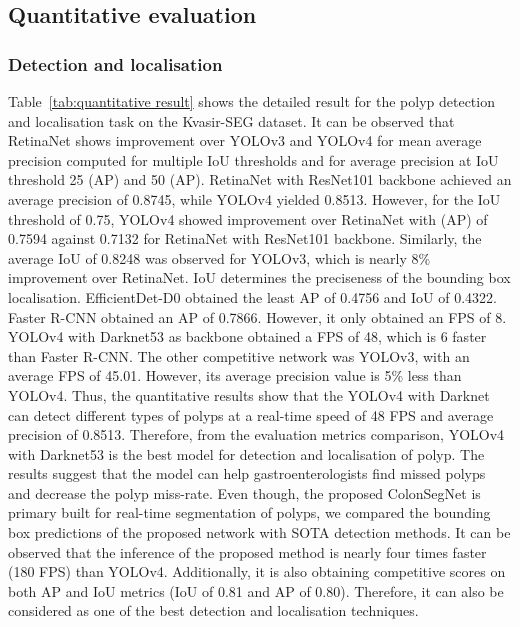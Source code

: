 \documentclass[journal]{IEEEtran}
\begin{document}
\subsection{Quantitative evaluation} 
\subsubsection{Detection and localisation} 
Table~\ref{tab:quantitative result} shows the detailed result for the polyp detection and localisation task on the Kvasir-SEG dataset. It can be observed that RetinaNet shows improvement over YOLOv3 and {YOLOv4} for mean average precision computed for multiple IoU thresholds and for average precision at \ac{IoU} threshold 25 (AP) and 50 (AP). RetinaNet with ResNet101 backbone achieved an average precision of 0.8745, while YOLOv4 yielded 0.8513. However, for the \ac{IoU} threshold of 0.75, YOLOv4 showed improvement over RetinaNet with (AP) of 0.7594 against 0.7132 for RetinaNet with ResNet101 backbone. Similarly, the average \ac{IoU} of 0.8248 was observed for YOLOv3, which is nearly 8\% improvement over RetinaNet. IoU determines the preciseness of the bounding box localisation. EfficientDet-D0 obtained the least AP of 0.4756 and \ac{IoU} of 0.4322. Faster R-CNN obtained an AP of 0.7866. However, it only obtained an \ac{FPS} of 8. YOLOv4 with Darknet53 as backbone obtained a \ac{FPS} of 48, which is 6 faster than Faster R-CNN. The other competitive network was YOLOv3, with an average \ac{FPS} of 45.01. However, its average precision value is 5\% less than YOLOv4. Thus, the quantitative results show that the YOLOv4 with Darknet can detect different types of polyps at a real-time speed of 48 \ac{FPS} and average precision of 0.8513. Therefore, from the evaluation metrics comparison, YOLOv4 with Darknet53 is the best model for detection and localisation of polyp.  The results suggest that the model can help gastroenterologists find missed polyps and decrease the polyp miss-rate. Even though, the proposed ColonSegNet is primary built for real-time segmentation of polyps, we compared the bounding box predictions of the proposed network with SOTA detection methods. It can be observed that  the inference of the proposed method is nearly four times faster (180 FPS) than YOLOv4. Additionally,  it is also obtaining competitive scores on both AP and IoU metrics (IoU of 0.81 and AP of 0.80). Therefore, it can also be considered as one of the best detection and localisation techniques. 
\end{document}
